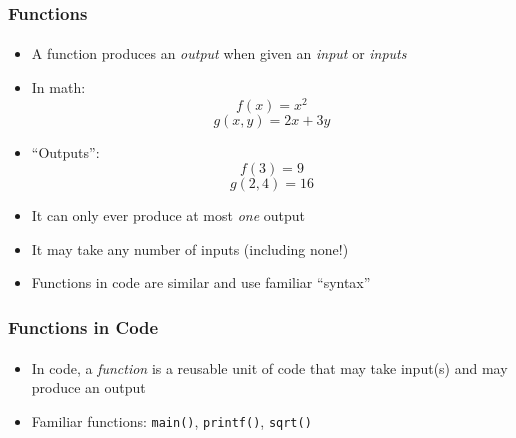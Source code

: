 \documentclass[]{beamer}
\begin{document}
\begin{frame}
    \frametitle{Functions}
    \framesubtitle{}

\begin{itemize}[<+->]
  \item A function produces an \emph{output} when given an \emph{input} or \emph{inputs}
  \item In math:
    $$f(x) = x^2$$
    $$g(x, y) = 2x + 3y$$
  \item ``Outputs'':
    $$f(3) = 9$$
    $$g(2, 4) = 16$$
  \item It can only ever produce at most \emph{one} output
  \item It may take any number of inputs (including none!)
  \item Functions in code are similar and use familiar ``syntax''
\end{itemize}    

\end{frame}

\begin{frame}[fragile]
    \frametitle{Functions in Code}
    \framesubtitle{}

\begin{itemize}[<+->]
  \item In code, a \emph{function} is a reusable unit of code that 
  may take input(s) and may produce an output
  \item Familiar functions: \texttt{main()}, \texttt{printf()},  \texttt{sqrt()}
\end{itemize}
\end{frame}

\end{document}
